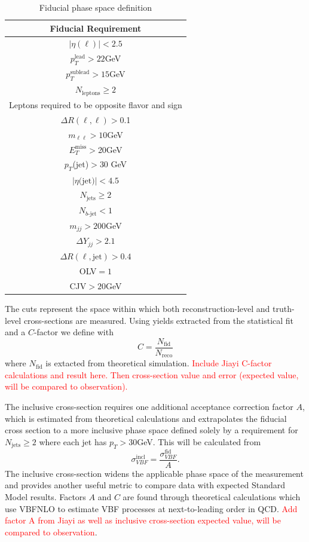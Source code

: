 \begin{table}[!ht]
\centering
\begin{tabular}{|c|}
\hline
Fiducial Requirement \\
\hline
$|\eta(\ell)|<2.5$ \\
$p_T^{\text{lead}}>22$GeV \\
$p_T^{\text{sublead}}>15$GeV \\
$N_{\text{leptons}}\geq2$ \\
Leptons required to be opposite flavor and sign \\
$\Delta R(\ell,\ell) >$0.1 \\
$m_{\ell\ell}>10$GeV \\
$E_T^{\text{miss}}>$20GeV \\
$p_T$(jet)$>$30 GeV \\
$|\eta\text{(jet)}|<4.5$ \\ 
$N_{\text{jets}} \geq 2$ \\
$N_{b\text{-jet}} < 1$ \\
$m_{jj} >200$GeV \\
$\Delta Y_{jj}>2.1$ \\
$\Delta R(\ell,\text{jet})>0.4$ \\
OLV$=1$ \\
CJV$>20$GeV \\
\hline
\end{tabular}
\caption{Fiducial phase space definition}
\label{tab:fiducial}
\end{table}
The cuts represent the space within which both reconstruction-level and truth-level cross-sections are measured. Using yields extracted from the statistical fit and a $C$-factor we define with 
\begin{equation}
C = \frac{N_\text{fid}}{N_{\text{reco}}}
\end{equation}
where $N_\text{fid}$ is extacted from theoretical simulation. \textcolor{red}{Include Jiayi C-factor calculations and result here. Then cross-section value and error (expected value, will be compared to observation).}

The inclusive cross-section requires one additional acceptance correction factor $A$, which is estimated from theoretical calculations and extrapolates the fiducial cross section to a more inclusive phase space defined solely by a requirement for $N_{\text{jets}}\geq2$ where each jet has $p_T>30$GeV. This will be calculated from
\begin{equation}
\sigma_{VBF}^{\text{incl}} = \frac{\sigma_{VBF}^{\text{fid}}}{A}.
\end{equation}
The inclusive cross-section widens the applicable phase space of the measurement and provides another useful metric to compare data with expected Standard Model results. Factors $A$ and $C$ are found through theoretical calculations which use VBFNLO to estimate VBF processes at next-to-leading order in QCD. \textcolor{red}{Add factor A from Jiayi as well as inclusive cross-section expected value, will be compared to observation}.

